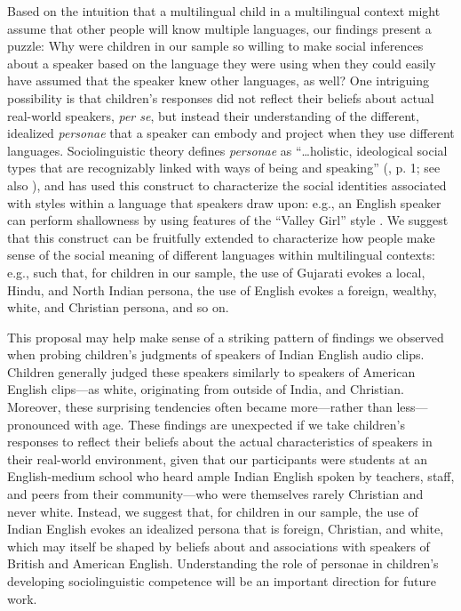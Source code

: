 \documentclass{foushee-adapted-preprint}
\begin{document}
Based on the intuition that a multilingual child in a multilingual context might assume that other people will know multiple languages, our findings present a puzzle: Why were children in our sample so willing to make social inferences about a speaker based on the language they were using when they could easily have assumed that the speaker knew other languages, as well? One intriguing possibility is that children's responses did not reflect their beliefs about actual real-world speakers, \textit{per se}, but instead their understanding of the different, idealized \textit{personae} that a speaker can embody and project when they use different languages.  
Sociolinguistic theory defines \textit{personae} as ``\ldots holistic, ideological social types that are recognizably linked with ways of being and speaking'' (\cite{donofrio2020personae}, p. 1; see also \cite{d2016social}), and has used this construct to characterize the social identities associated with styles within a language that speakers draw upon: e.g., an English speaker can perform shallowness by using features of the ``Valley Girl'' style \parencite[e.g., including uptalk and using `like' as a discourse marker;][]{pratt2017jaw, d2015persona}. We suggest that this construct can be fruitfully extended to characterize how people make sense of the social meaning of different languages within multilingual contexts: e.g., such that, for children in our sample, the use of Gujarati evokes a local, Hindu, and North Indian persona, the use of English evokes a foreign, wealthy, white, and Christian persona, and so on. 

This proposal may help make sense of a striking pattern of findings we observed when probing children's judgments of speakers of Indian English audio clips. Children generally judged these speakers similarly to speakers of American English clips---as white, originating from outside of India, and Christian. Moreover, these surprising tendencies often became more---rather than less---pronounced with age. %
These findings are unexpected if we take children's responses to reflect their beliefs about the actual characteristics of speakers in their real-world environment, given that our participants were students at an English-medium school who heard ample Indian English spoken by teachers, staff, and peers from their community---who were themselves rarely Christian and never white. Instead, we suggest that, for children in our sample, the use of Indian English evokes an idealized persona that is foreign, Christian, and white, which may itself be shaped by beliefs about and associations with speakers of British and American English. %
Understanding the role of personae in children's developing sociolinguistic competence will be an important direction for future work.
\end{document}
